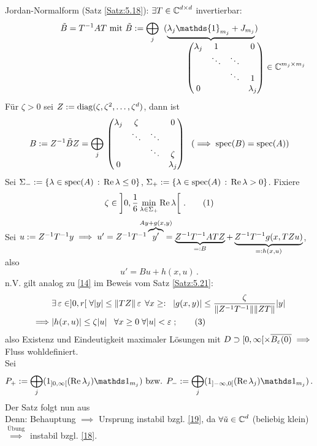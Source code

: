 \documentclass[a4paper]{article}
\begin{document}
\begin{Beweis}
Jordan-Normalform (Satz \ref{Satz:5.18}): $\exists T\in\operatorname{\mathbb C}^{d\times d}$ invertierbar:
\[\tilde{B}=T^{-1}AT\te{mit }\tilde{B}:=\bigoplus_j\;\;(\underbrace{\lambda_j\mathds{1}_{m_j}+J_{m_j}}_{\mathrlap{\hspace{-1cm}\vv{\lambda_j&1&&0\\&\ddots&\ddots&\\&&\ddots&1\\0&&&\lambda_j}\displaystyle\in\CC^{m_j\times m_j}}})\]
Für $\zeta>0$ sei $Z:=\operatorname{\mathrm{diag}}(\zeta,\zeta^2,\ldots,\zeta^d)$, dann ist
\[B:=Z^{-1}\tilde{B}Z=\bigoplus_j\mathop{}\begin{pmatrix}\lambda_j&\zeta&&0\\&\ddots&\ddots&\\&&\ddots&\zeta\\0&&&\lambda_j\end{pmatrix}\;\text{ ($\implies \operatorname{\mathrm{spec}}(B)=\operatorname{\mathrm{spec}}(A)$)}\]
Sei $\Sigma_-:=\{\lambda\in \operatorname{\mathrm{spec}}(A)\,:\,\operatorname{\textrm{Re}}\lambda\le 0\}$, $\Sigma_+:=\{\lambda\in \operatorname{\mathrm{spec}}(A)\,:\,\operatorname{\textrm{Re}}\lambda>0\}$. Fixiere
\[\zeta\in \left]0,\frac{1}{6}\min_{\lambda\in\Sigma_+}\operatorname{\textrm{Re}}\lambda\right[\,.\tag{$1$}\label{18}\]
Sei $u:=Z^{-1}T^{-1}y\implies u'=Z^{-1}T^{-1}\overbrace{y'}^{\mathclap{Ay+g(x,y)}}=\underbrace{Z^{-1}T^{-1}ATZ}_{=:B}+\underbrace{Z^{-1}T^{-1}g(x,TZu)}_{=:h(x,u)}$, also
\[u'=Bu+h(x,u)\,.\tag{$2$}\label{19}\]
n.V. gilt analog zu \eqref{14} im Beweis vom Satz \ref{Satz:5.21}:
\begin{align*}
&\exists \operatorname{\varepsilon}\in]0,r[\;\forall |y|\le \|TZ\|\operatorname{\varepsilon}\;\forall x\ge:\;\;|g(x,y)|\le \frac{\zeta}{\|Z^{-1}T^{-1}\|\|ZT\|}|y|\\
\implies&|h(x,u)|\le\zeta|u|\;\;\;\forall x\ge0\;\forall |u|<\operatorname{\varepsilon}\;;\tag{$3$}\label{20}
\end{align*}
also Existenz und Eindeutigkeit maximaler Lösungen mit $D\supset [0,\infty[\times\overline{B_{\operatorname{\varepsilon}}(0)}\implies $ Fluss wohldefiniert.\\
Sei
\[P_+:=\bigoplus_j(1_{]0,\infty[}(\Rea\lambda_j)\mathds1_{m_j})\te{bzw. }P_-:=\bigoplus_j(1_{]-\infty,0[}(\Rea\lambda_j)\mathds1_{m_j})\,.\]
Der Satz folgt nun aus\\
Denn: Behauptung $\implies$ Ursprung instabil bzgl. \eqref{19}, da $\forall \tilde{u}\in \operatorname{\mathbb C}^d$ (beliebig klein) $\overset{\text{Übung}}{\implies}$ instabil bzgl. \eqref{18}.\\

\end{Beweis}
\end{document}
